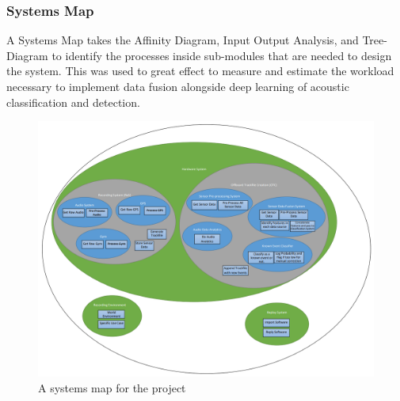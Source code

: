 \documentclass{UoNMCHA}
\numberwithin{equation}{section}
\begin{document}
\subsubsection{Systems Map}
A Systems Map takes the Affinity Diagram, Input Output Analysis, and Tree-Diagram to identify the processes inside sub-modules that are needed to design the system. This was used to great effect to measure and estimate the workload necessary to implement data fusion alongside deep learning of acoustic classification and detection.
\begin{figure}[ht]
    \begin{center}
        \includegraphics[width=0.8\linewidth]{Figures/SystemMap.png}
        \caption{A systems map for the project}
        \label{fig:AndroidDataExample}
    \end{center}
 \end{figure}
\end{document}
